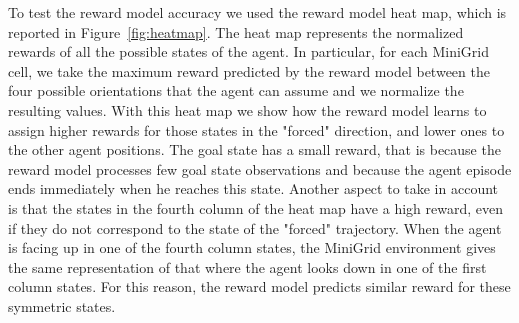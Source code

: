 To test the reward model accuracy we used the reward model heat map, which is reported in Figure\ \ref{fig:heatmap}. The heat map represents the normalized rewards of all the possible states of the agent. In particular, for each MiniGrid cell, we take the maximum reward predicted by the reward model between the four possible orientations that the agent can assume and we normalize the resulting values. 
With this heat map we show how the reward model learns to assign higher rewards for those states in the "forced" direction, and lower ones to the other agent positions. The goal state has a small reward, that is because the reward model processes few goal state observations and because the agent episode ends immediately when he reaches this state. Another aspect to take in account is that the states in the fourth column of the heat map have a high reward, even if they do not correspond to the state of the "forced" trajectory. When the agent is facing up in one of the fourth column states, the MiniGrid environment gives the same representation of that where the agent looks down in one of the first column states. For this reason, the reward model predicts similar reward for these symmetric states. 

